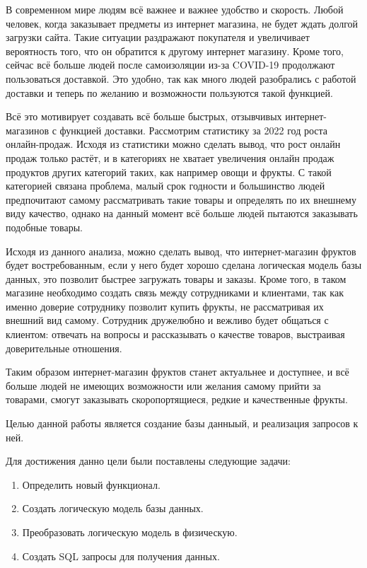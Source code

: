 \documentclass[14pt]{extreport}
\begin{document}
\pagestyle{empty} %


\setcounter{page}{1}
\tableofcontents

\intro
\pagestyle{plain} %
\setcounter{page}{1}
В современном мире людям всё важнее и важнее удобство и скорость. Любой человек, когда заказывает предметы из интернет магазина, не будет ждать долгой загрузки сайта. Такие ситуации раздражают покупателя и увеличивает вероятность того, что он обратится к другому интернет магазину.
Кроме того, сейчас всё больше людей после самоизоляции из-за COVID-19 продолжают пользоваться доставкой. Это удобно, так как много людей разобрались с работой доставки и теперь по желанию и возможности пользуются такой функцией. 

Всё это мотивирует создавать всё больше быстрых, отзывчивых интернет-магазинов с функцией доставки. Рассмотрим статистику за 2022 год роста онлайн-продаж. Исходя из статистики можно сделать вывод, что рост онлайн продаж только растёт, и в категориях не хватает увеличения онлайн продаж продуктов других категорий таких, как например овощи и фрукты. С такой категорией связана проблема, малый срок годности и большинство людей предпочитают самому рассматривать такие товары и определять по их внешнему виду качество, однако на данный момент всё больше людей пытаются заказывать подобные товары.

Исходя из данного анализа, можно сделать вывод, что интернет-магазин фруктов будет востребованным, если у него будет хорошо сделана логическая модель базы данных, это позволит быстрее загружать товары и заказы. Кроме того, в таком магазине необходимо создать связь между сотрудниками и клиентами, так как именно доверие сотруднику позволит купить фрукты, не рассматривая их внешний вид самому. Сотрудник дружелюбно и вежливо будет общаться с клиентом: отвечать на вопросы и рассказывать о качестве товаров, выстраивая доверительные отношения.

Таким образом интернет-магазин фруктов станет актуальнее и доступнее, и всё больше людей не имеющих возможности или желания самому прийти за товарами, смогут заказывать скоропортящиеся, редкие и качественные фрукты.

Целью данной работы является создание базы данныый, и реализация запросов к ней.

Для достижения данно цели были поставлены следующие задачи:
\begin{enumerate}
    \item Определить новый функционал.
    \item Создать логическую модель базы данных.
    \item Преобразовать логическую модель в физическую.
    \item Создать SQL запросы для получения данных. 
\end{enumerate}
\end{document}
